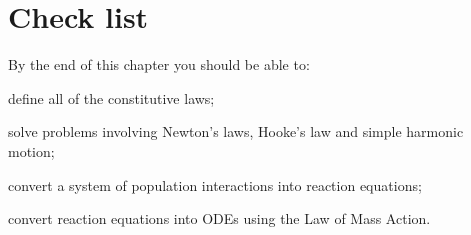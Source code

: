 \section{Check list}
By the end of this chapter you should be able to:
\begin{todolist}
\item define all of the constitutive laws;
\item solve problems involving Newton's laws, Hooke's law and simple harmonic motion;
\item convert a system of population interactions into reaction equations;
\item convert reaction equations into ODEs using the Law of Mass Action.
\end{todolist}




